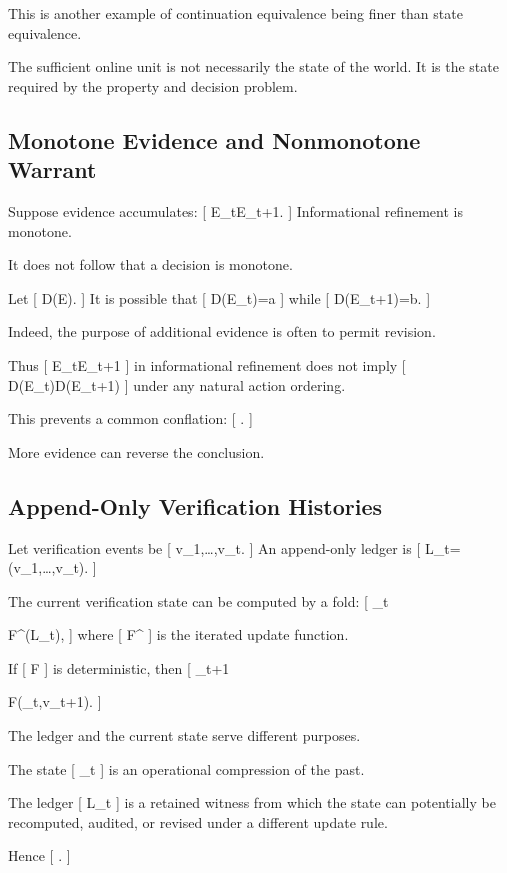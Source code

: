 \documentclass[11pt]{article}
\begin{document}
This is another example of continuation equivalence being finer than state equivalence.

The sufficient online unit is not necessarily the state of the world. It is the state required by the property and decision problem.

\subsection{Monotone Evidence and Nonmonotone Warrant}

Suppose evidence accumulates:
[
E_t\subseteq E_{t+1}.
]
Informational refinement is monotone.

It does not follow that a decision is monotone.

Let
[
D(E).
]
It is possible that
[
D(E_t)=a
]
while
[
D(E_{t+1})=b.
]

Indeed, the purpose of additional evidence is often to permit revision.

Thus
[
E_t\preceq E_{t+1}
]
in informational refinement does not imply
[
D(E_t)\preceq D(E_{t+1})
]
under any natural action ordering.

This prevents a common conflation:
[
\not\Rightarrow
{}.
]

More evidence can reverse the conclusion.

\subsection{Append-Only Verification Histories}

Let verification events be
[
v_1,\ldots,v_t.
]
An append-only ledger is
[
L_t=(v_1,\ldots,v_t).
]

The current verification state can be computed by a fold:
[
\sigma_t

F^\ast(L_t),
]
where
[
F^\ast
]
is the iterated update function.

If
[
F
]
is deterministic, then
[
\sigma_{t+1}

F(\sigma_t,v_{t+1}).
]

The ledger and the current state serve different purposes.

The state
[
\sigma_t
]
is an operational compression of the past.

The ledger
[
L_t
]
is a retained witness from which the state can potentially be recomputed, audited, or revised under a different update rule.

Hence
[
\neq
{}.
]
\end{document}
